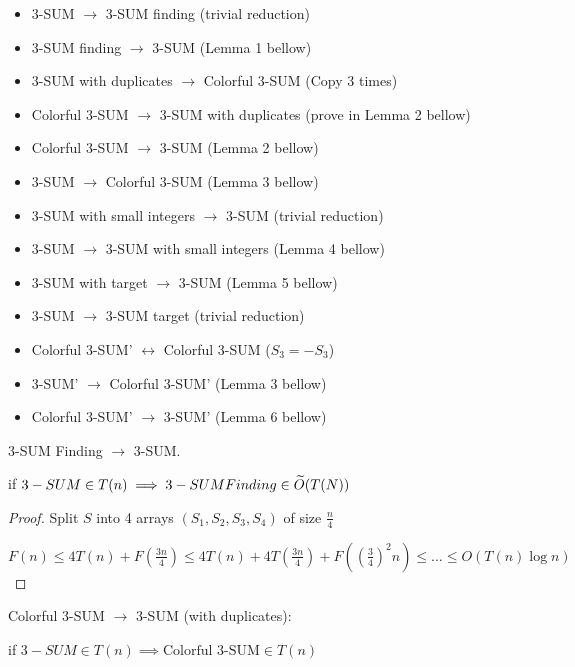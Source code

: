 \begin{itemize}
	\item 3-SUM $\to$ 3-SUM finding (trivial reduction)
	\item 3-SUM finding $\to$ 3-SUM (Lemma 1 bellow)

	\item 3-SUM with duplicates $\to$ Colorful 3-SUM (Copy 3 times)
	\item Colorful 3-SUM $\to$ 3-SUM with duplicates (prove in Lemma 2 bellow)

	\item Colorful 3-SUM $\to$ 3-SUM (Lemma 2 bellow)
	\item 3-SUM $\to$ Colorful 3-SUM (Lemma 3 bellow)

	\item 3-SUM with small integers $\to$ 3-SUM (trivial reduction)
	\item 3-SUM $\to$ 3-SUM with small integers (Lemma 4 bellow)

	\item 3-SUM with target $\to$ 3-SUM (Lemma 5 bellow)
	\item 3-SUM $\to$ 3-SUM target (trivial reduction)

	\item Colorful 3-SUM' $\longleftrightarrow$ Colorful 3-SUM ($S_3 = -S_3$)

	\item 3-SUM' $\to$ Colorful 3-SUM' (Lemma 3 bellow)
	\item Colorful 3-SUM' $\to$ 3-SUM' (Lemma 6 bellow)
\end{itemize}

\begin{lm}
	3-SUM Finding $\to$ 3-SUM.

	if $3-SUM \in T(n) \implies 3-SUM Finding \in \widetilde{O}(T(N))$
\end{lm}

\begin{proof}
	Split $S $ into 4 arrays $(S_1, S_2, S_3, S_4)$  of size $\frac{n}{4}$

	$F(n) \le 4 T(n) + F(\frac{3n}{4}) \le 4 T(n) + 4T(\frac{3n}{4}) + F((\frac{3}{4})^2 n) \le \ldots \le O(T(n) \log n)$
\end{proof}

\begin{lm}
	Colorful 3-SUM $\to$ 3-SUM (with duplicates):

	if $3-SUM \in T(n) \implies \text{Colorful 3-SUM} \in T(n)$
\end{lm}

